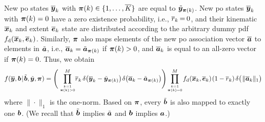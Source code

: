 \documentclass[11pt,a4paper]{article}
\newcommand{\ist}{\hspace*{.3mm}}
\newcommand{\rmv}{\hspace*{-.3mm}}
\newcommand{\ynew}{\overline{\V{y}}}
\newcommand{\avnew}{\overline{\V{a}}}
\newcommand{\xnew}{\overline{\V{x}}}
\newcommand{\enew}{\overline{\V{e}}}
\newcommand{\rnew}{\overline{r}}
\newcommand{\yt}{\tilde{\V{y}}}
\newcommand{\avt}{\tilde{\V{a}}}
\newcommand{\fd}{f_{\mathrm{d}}}
\begin{document}
\begin{enumerate}
New \ac{po} states $\ynew_k$ with $\bm{\pi}(k) \in \{1,\dots,\overline{K}\}$ are equal to $\yt_{\V{\pi}(k)}$. New \ac{po} states $\ynew_k$ with $\bm{\pi}(k) = 0$ have a zero existence probability, i.e., $\overline{r}_k \rmv=\rmv 0$, and their kinematic $\overline{\bm{x}}_k$ and extent $\overline{\bm{e}}_k$ state are distributed according to the arbitrary dummy pdf $\fd(\overline{\V{x}}_k,\overline{\V{e}}_k)$. Similarly, $\bm{\pi}$ also maps elements of the new \ac{po} association vector $\overline{\bm{a}}$ to elements in $\tilde{\bm{a}}$, i.e., $\avnew_k = \avt_{\V{\pi}(k)}$ if $\bm{\pi}(k)>0$, and $\avnew_k$ is equal to an all-zero vector if $\bm{\pi}(k) = 0$. Thus, we obtain
%
\begin{align}
f(\overline{\V{y}}, \V{b} \ist | \ist \tilde{\V{b}},\tilde{\V{y}},\V{\pi}) = \Bigg(\prod_{k=1 \atop \V{\pi}(k)>0}^M \rmv\rmv\rmv  \rnew_k \ist\ist \delta\big(\ynew_k-\yt_{\V{\pi}(k)}\big) \ist \delta\big(\avnew_k-\avt_{\V{\pi}(k)}\big)\Bigg) 
\rmv\rmv \prod_{k=1 \atop \V{\pi}(k)=0}^M \rmv\rmv \fd(\xnew_k,\enew_k) \ist (1-\rnew_k) \hspace{.5mm} \delta\big(\ist \| \avnew_k \|_1\big)
\label{eq:mapping}
\end{align}
%
 where $\|\cdot\|_1$ is the one-norm. Based on $\bm{\pi}$, every $\tilde{\bm{b}}$ is also mapped to exactly one ${\bm{b}}$. (We recall that $\tilde{\bm{b}}$ implies $\tilde{\bm{a}}$ and $\bm{b}$ implies $\bm{a}$.)


\end{enumerate}
\end{document}

